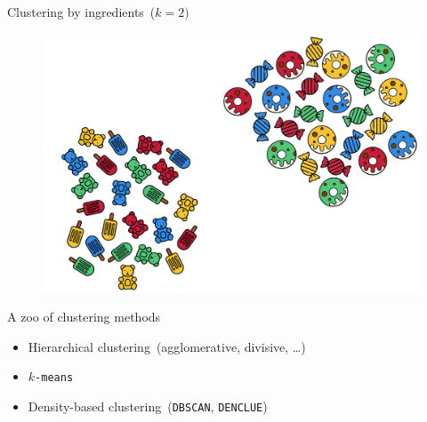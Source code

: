 \documentclass[aspectratio=169]{beamer}
\begin{document}
  \begin{frame}{Clustering by ingredients~($k = 2)$}
    \begin{figure}
      \includegraphics[width=0.75\linewidth]{Figures/Clustering_by_ingredients}
    \end{figure}
  \end{frame}

  \begin{frame}{A zoo of clustering methods}
    \begin{itemize}
      \item Hierarchical clustering~(agglomerative, divisive, \dots)
      \item \texttt{$k$-means}
      \item Density-based clustering~(\texttt{DBSCAN}, \texttt{DENCLUE})
    \end{itemize}
  \end{frame}
\end{document}
